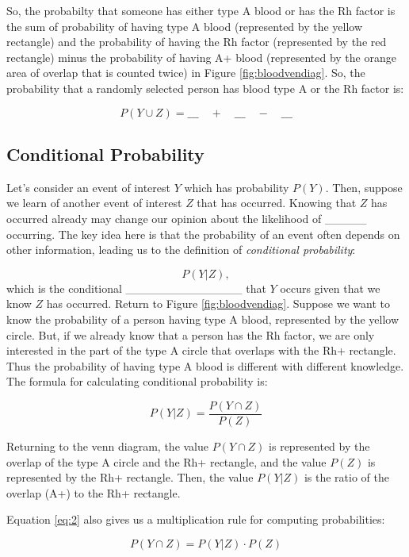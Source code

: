 \documentclass[]{book}
\theoremstyle{definition}
\theoremstyle{definition}
\theoremstyle{remark}
\begin{document}
So, the probabilty that someone has either type A blood or has the Rh
factor is the sum of probability of having type A blood (represented by
the yellow rectangle) and the probability of having the Rh factor
(represented by the red rectangle) minus the probability of having A+
blood (represented by the orange area of overlap that is counted twice)
in Figure \ref{fig:bloodvendiag}. So, the probability that a randomly
selected person has blood type A or the Rh factor is:

\[ P(Y \cup Z) = \_\_\_ \quad + \quad \_\_\_ \quad - \quad \_\_\_\]

\subsection{Conditional Probability}\label{conditional-probability}

Let's consider an event of interest \(Y\) which has probability
\(P(Y)\). Then, suppose we learn of another event of interest \(Z\) that
has occurred. Knowing that \(Z\) has occurred already may change our
opinion about the likelihood of \_\_\_\_\_ occurring. The key idea here
is that the probability of an event often depends on other information,
leading us to the definition of \emph{conditional probability}:

\[ P(Y|Z), \] which is the conditional \_\_\_\_\_\_\_\_\_\_\_\_\_\_ that
\(Y\) occurs given that we know \(Z\) has occurred. Return to Figure
\ref{fig:bloodvendiag}. Suppose we want to know the probability of a
person having type A blood, represented by the yellow circle. But, if we
already know that a person has the Rh factor, we are only interested in
the part of the type A circle that overlaps with the Rh+ rectangle. Thus
the probability of having type A blood is different with different
knowledge. The formula for calculating conditional probability is:

\begin{equation}\label{eq:2}
P(Y|Z) = \frac{P(Y\cap Z)}{P(Z)}
\end{equation}

Returning to the venn diagram, the value \(P(Y \cap Z)\) is represented
by the overlap of the type A circle and the Rh+ rectangle, and the value
\(P(Z)\) is represented by the Rh+ rectangle. Then, the value \(P(Y|Z)\)
is the ratio of the overlap (A+) to the Rh+ rectangle.

Equation \ref{eq:2} also gives us a multiplication rule for computing
probabilities:

\begin{equation}\label{eq:3}
P(Y\cap Z) = P(Y|Z) \cdot P(Z)
\end{equation}
\end{document}
